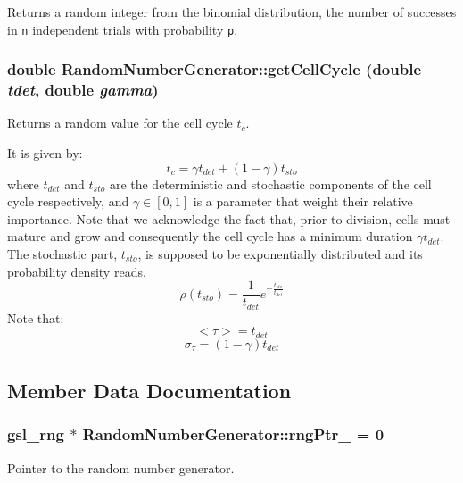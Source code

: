 Returns a random integer from the binomial distribution, the number of successes in {\tt n} independent trials with probability {\tt p}. 

\subsubsection{\setlength{\rightskip}{0pt plus 5cm}double RandomNumberGenerator::getCellCycle (double {\em tdet}, \/  double {\em gamma})\hspace{0.3cm}{\tt  [static]}}\label{classRandomNumberGenerator_4a8e5b43607e3d3d406bdc4f07ca3567}


Returns a random value for the cell cycle $t_c$. 

It is given by: \[ t_c = \gamma t_{det} + (1-\gamma)t_{sto} \] where $t_{det}$ and $t_{sto}$ are the deterministic and stochastic components of the cell cycle respectively, and $\gamma\in [0,1]$ is a parameter that weight their relative importance. Note that we acknowledge the fact that, prior to division, cells must mature and grow and consequently the cell cycle has a minimum duration $\gamma t_{det}$. The stochastic part, $t_{sto}$, is supposed to be exponentially distributed and its probability density reads, \[ \rho(t_{sto}) = \frac{1}{t_{det}} e^{-\frac{t_{sto}}{t_{det}}} \] Note that: \[ <\tau> = t_{det} \] \[ \sigma_{\tau} = (1-\gamma) t_{det} \] 

\subsection{Member Data Documentation}
\subsubsection{\setlength{\rightskip}{0pt plus 5cm}gsl\_\-rng $\ast$ {\bf RandomNumberGenerator::rngPtr\_\-} = 0\hspace{0.3cm}{\tt  [static, private]}}\label{classRandomNumberGenerator_1f60eeed4ca919d3b009ec559d6d8c14}


Pointer to the random number generator. 

